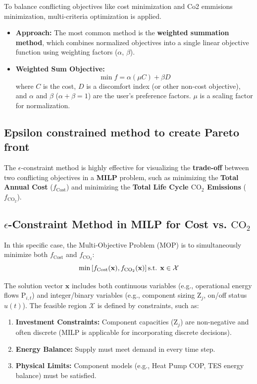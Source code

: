 \documentclass[11pt,a4paper]{report}
\begin{document}
To balance conflicting objectives like cost minimization and Co2 emmisions minimization, multi-criteria optimization is applied.

\begin{itemize}
    \item \textbf{Approach:} The most common method is the \textbf{weighted summation method}, which combines normalized objectives into a single linear objective function using weighting factors ($\alpha$, $\beta$).
    \item \textbf{Weighted Sum Objective:}
    $$\min f = \alpha (\mu C) + \beta D$$
    where $C$ is the cost, $D$ is a discomfort index (or other non-cost objective), and $\alpha$ and $\beta$ ($\alpha + \beta = 1$) are the user's preference factors. $\mu$ is a scaling factor for normalization.
\end{itemize}

\subsection{Epsilon constrained method to create Pareto front}

The $\epsilon$-constraint method is highly effective for visualizing the \textbf{trade-off} between two conflicting objectives in a \textbf{MILP} problem, such as minimizing the \textbf{Total Annual Cost} ($f_{\text{Cost}}$) and minimizing the \textbf{Total Life Cycle $\text{CO}_2$ Emissions} ($f_{\text{CO}_2}$).

\subsection*{$\epsilon$-Constraint Method in MILP for Cost vs. $\text{CO}_2$}

In this specific case, the Multi-Objective Problem (MOP) is to simultaneously minimize both $f_{\text{Cost}}$ and $f_{\text{CO}_2}$:
$$
\min \left[ f_{\text{Cost}}(\mathbf{x}), f_{\text{CO}_2}(\mathbf{x}) \right] \\
\text{s.t. } \mathbf{x} \in \mathcal{X}
$$

The solution vector $\mathbf{x}$ includes both continuous variables (e.g., operational energy flows $\text{P}_{i,t}$) and integer/binary variables (e.g., component sizing $\text{Z}_j$, on/off status $u(t)$).
The feasible region $\mathcal{X}$ is defined by constraints, such as:
\begin{enumerate}
    \item \textbf{Investment Constraints:} Component capacities ($\text{Z}_j$) are non-negative and often discrete (MILP is applicable for incorporating discrete decisions).
    \item \textbf{Energy Balance:} Supply must meet demand in every time step.
    \item \textbf{Physical Limits:} Component models (e.g., Heat Pump COP, TES energy balance) must be satisfied.
\end{enumerate}
\end{document}
